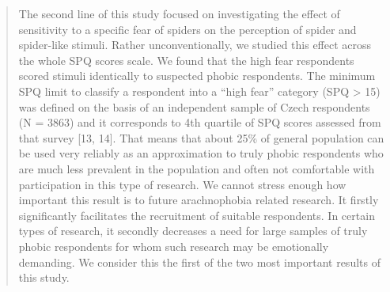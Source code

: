 \documentclass[
]{book}
\begin{document}
\begin{quote}
The second line of this study focused on investigating the effect of sensitivity to a specific fear of spiders on the perception of spider and spider-like stimuli. Rather unconventionally, we studied this effect across the whole SPQ scores scale. We found that the high fear respondents scored stimuli identically to suspected phobic respondents. The minimum SPQ limit to classify a respondent into a ``high fear'' category (SPQ \textgreater{} 15) was defined on the basis of an independent sample of Czech respondents (N = 3863) and it corresponds to 4th quartile of SPQ scores assessed from that survey {[}13, 14{]}. That means that about 25\% of general population can be used very reliably as an approximation to truly phobic respondents who are much less prevalent in the population and often not comfortable with participation in this type of research. We cannot stress enough how important this result is to future arachnophobia related research. It firstly significantly facilitates the recruitment of suitable respondents. In certain types of research, it secondly decreases a need for large samples of truly phobic respondents for whom such research may be emotionally demanding. We consider this the first of the two most important results of this study.
\end{quote}
\end{document}
